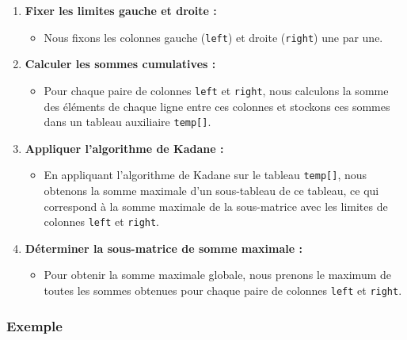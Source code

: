 \documentclass[
]{article}
\providecommand{\tightlist}{%
  \setlength{\itemsep}{0pt}\setlength{\parskip}{0pt}}
\begin{document}
\begin{enumerate}
\def\labelenumi{\arabic{enumi}.}
\tightlist
\item
  \textbf{Fixer les limites gauche et droite :}

  \begin{itemize}
  \tightlist
  \item
    Nous fixons les colonnes gauche (\texttt{left}) et droite
    (\texttt{right}) une par une.
  \end{itemize}
\item
  \textbf{Calculer les sommes cumulatives :}

  \begin{itemize}
  \tightlist
  \item
    Pour chaque paire de colonnes \texttt{left} et \texttt{right}, nous
    calculons la somme des éléments de chaque ligne entre ces colonnes
    et stockons ces sommes dans un tableau auxiliaire
    \texttt{temp{[}{]}}.
  \end{itemize}
\item
  \textbf{Appliquer l'algorithme de Kadane :}

  \begin{itemize}
  \tightlist
  \item
    En appliquant l'algorithme de Kadane sur le tableau
    \texttt{temp{[}{]}}, nous obtenons la somme maximale d'un
    sous-tableau de ce tableau, ce qui correspond à la somme maximale de
    la sous-matrice avec les limites de colonnes \texttt{left} et
    \texttt{right}.
  \end{itemize}
\item
  \textbf{Déterminer la sous-matrice de somme maximale :}

  \begin{itemize}
  \tightlist
  \item
    Pour obtenir la somme maximale globale, nous prenons le maximum de
    toutes les sommes obtenues pour chaque paire de colonnes
    \texttt{left} et \texttt{right}.
  \end{itemize}
\end{enumerate}

\subsubsection{Exemple}\label{exemple}
\end{document}
